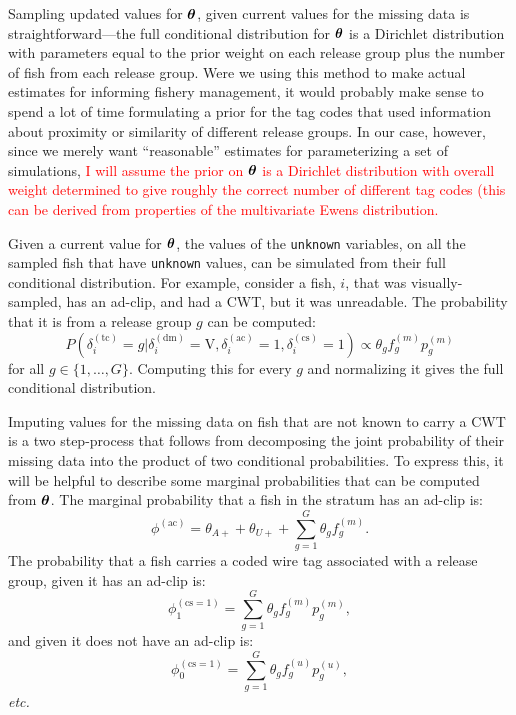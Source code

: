 \documentclass[11pt]{article}
\makeatletter
\def\bm#1{\mathpalette\bmstyle{#1}}
\def\bmstyle#1#2{\mbox{\boldmath$#1#2$}}
\newcommand{\etc}{{\em etc.}\@\xspace}
\newcommand{\btheta}{\bm{\theta}}
\makeatother
\begin{document}
Sampling updated values for $\btheta$, given current values for the missing data is straightforward---the 
full conditional distribution for $\btheta$ is a Dirichlet distribution
with parameters equal to the prior weight on each
release group plus the number of fish from each release group.  Were we using this method to make actual estimates
for informing fishery management, it would probably make sense to spend a lot of time formulating a prior
for the tag codes that used information about proximity or similarity of different release groups. In our
case, however, since we merely want ``reasonable'' estimates for parameterizing a set of simulations, \textcolor{red}{I will assume
the prior on $\btheta$ is a Dirichlet distribution with overall weight determined to give roughly the correct
number of different tag codes (this can be derived from properties of the multivariate Ewens distribution.}

Given a current value for $\btheta$, the values of the {\tt unknown} variables, on all the sampled fish that have
{\tt unknown} values, can be simulated from their full conditional distribution.  For example,
consider a fish, $i$, that was visually-sampled, has an ad-clip, and had a CWT, but it was unreadable.  The 
probability that it is from a release group $g$ can be computed:
\[
P(\delta_i^{(\mathrm{tc})} = g | \delta_i^{(\mathrm{dm})}=\mathrm{V}, \delta_i^{(\mathrm{ac})} = 1, \delta_i^{(\mathrm{cs})} = 1)
\propto
\theta_g f_g^{(m)} p_g^{(m)}
\]
for all $g \in \{1,\ldots,G\}$. Computing this for every $g$ and normalizing it gives the full conditional distribution.

Imputing values for the missing data on fish that are not known to carry a CWT is a two step-process that follows
from decomposing the joint probability of their missing data into the product of two conditional probabilities.
To express this, it will be helpful to describe some marginal probabilities that can be computed from $\btheta$.  The marginal probability that a fish in the stratum has an ad-clip is:
\[
\phi^{(\mathrm{ac})} = \theta_{A+} + \theta_{U+} + \sum_{g=1}^G \theta_g f^{(m)}_g.
\]
The probability that a fish carries a coded wire tag associated with a release group, given it has an ad-clip is:
\[
\phi^{(\mathrm{cs}=1)}_1 =  \sum_{g=1}^G \theta_g f^{(m)}_g p^{(m)}_g,
\]
and given it does not have an ad-clip is:
\[
\phi^{(\mathrm{cs}=1)}_0 =  \sum_{g=1}^G \theta_g f^{(u)}_g p^{(u)}_g,
\]
\etc
\end{document}
